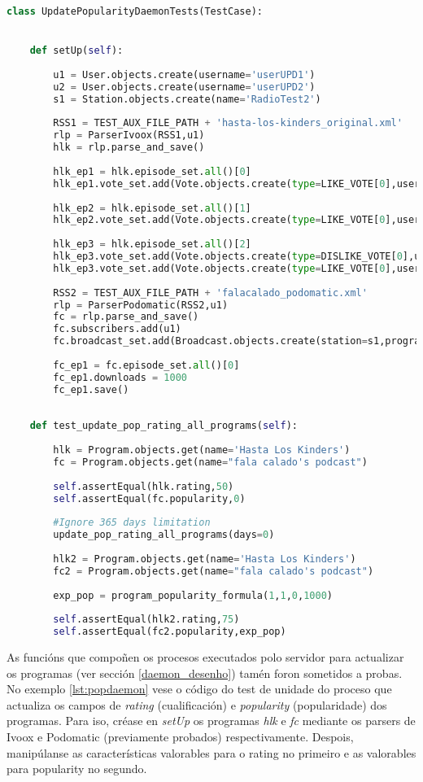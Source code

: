 \begin{lstlisting}[language=Python, caption=Probas de unidade do proceso de actualización de popularidade, label=lst:popdaemon]
class UpdatePopularityDaemonTests(TestCase):


	def setUp(self):
	
		u1 = User.objects.create(username='userUPD1')
		u2 = User.objects.create(username='userUPD2')
		s1 = Station.objects.create(name='RadioTest2')
		
		RSS1 = TEST_AUX_FILE_PATH + 'hasta-los-kinders_original.xml'
		rlp = ParserIvoox(RSS1,u1)
		hlk = rlp.parse_and_save()
		
		hlk_ep1 = hlk.episode_set.all()[0]
		hlk_ep1.vote_set.add(Vote.objects.create(type=LIKE_VOTE[0],user=u1,episode=hlk_ep1))
		
		hlk_ep2 = hlk.episode_set.all()[1]
		hlk_ep2.vote_set.add(Vote.objects.create(type=LIKE_VOTE[0],user=u1,episode=hlk_ep2))
		
		hlk_ep3 = hlk.episode_set.all()[2]
		hlk_ep3.vote_set.add(Vote.objects.create(type=DISLIKE_VOTE[0],user=u1,episode=hlk_ep3))
		hlk_ep3.vote_set.add(Vote.objects.create(type=LIKE_VOTE[0],user=u2,episode=hlk_ep3))
		
		RSS2 = TEST_AUX_FILE_PATH + 'falacalado_podomatic.xml'
		rlp = ParserPodomatic(RSS2,u1)
		fc = rlp.parse_and_save()
		fc.subscribers.add(u1)
		fc.broadcast_set.add(Broadcast.objects.create(station=s1,program=fc,schedule_details='Friday 21:00'))
		
		fc_ep1 = fc.episode_set.all()[0]
		fc_ep1.downloads = 1000
		fc_ep1.save()
	
	
	def test_update_pop_rating_all_programs(self):
		
		hlk = Program.objects.get(name='Hasta Los Kinders')
		fc = Program.objects.get(name="fala calado's podcast")
		
		self.assertEqual(hlk.rating,50)
		self.assertEqual(fc.popularity,0)
		
		#Ignore 365 days limitation
		update_pop_rating_all_programs(days=0)
		
		hlk2 = Program.objects.get(name='Hasta Los Kinders')
		fc2 = Program.objects.get(name="fala calado's podcast")
		
		exp_pop = program_popularity_formula(1,1,0,1000)
		
		self.assertEqual(hlk2.rating,75)
		self.assertEqual(fc2.popularity,exp_pop)
\end{lstlisting}

As funcións que compoñen os procesos executados polo servidor para actualizar os programas (ver sección \ref{daemon_desenho}) tamén foron sometidos a probas. No exemplo \ref{lst:popdaemon} vese o código do test de unidade do proceso que actualiza os campos de \textit{rating} (cualificación) e \textit{popularity} (popularidade) dos programas. Para iso, créase en \textit{setUp} os programas \textit{hlk} e \textit{fc} mediante os parsers de Ivoox e Podomatic (previamente probados) respectivamente. Despois, manipúlanse as características valorables para o rating no primeiro e as valorables para popularity no segundo.

